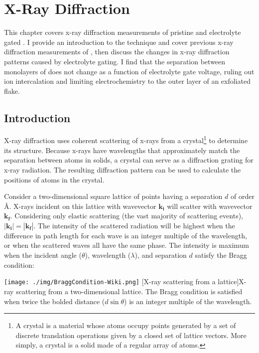 \chapter{X-Ray Diffraction}

This chapter covers x-ray diffraction measurements of pristine and electrolyte gated \ruclnospace . I provide an introduction to the technique and cover previous x-ray diffraction measurements of \ruclnospace , then discuss the changes in x-ray diffraction patterns caused by electrolyte gating. I find that the separation between monolayers of \rucl does not change as a function of electrolyte gate voltage, ruling out ion intercalation and limiting electrochemistry to the outer layer of an exfoliated flake.

\section{Introduction}

X-ray diffraction uses coherent scattering of x-rays from a crystal\footnote{A crystal is a material whose atoms occupy points generated by a set of discrete translation operations given by a closed set of lattice vectors. More simply, a crystal is a solid made of a regular array of atoms.} to determine its structure. Because x-rays have wavelengths that approximately match the separation between atoms in solids, a crystal can serve as a diffraction grating for x-ray radiation. The resulting diffraction pattern can be used to calculate the positions of atoms in the crystal.

Consider a two-dimensional square lattice of points having a separation $d$ of order \AA . X-rays incident on this lattice with wavevector $\mathbf{k_{i}}$ will scatter with wavevector $\mathbf{k_{f}}$. Considering only elastic scattering (the vast majority of scattering events), $|\mathbf{k_{i}}| = |\mathbf{k_{f}}|$. The intensity of the scattered radiation will be highest when the difference in path length for each wave is an integer multiple of the wavelength, or when the scattered waves all have the same phase. The intensity is maximum when the incident angle ($\theta$), wavelength ($\lambda$), and separation $d$ satisfy the Bragg condition:

\begin{centering}
\texttt{[image: ./img/BraggCondition-Wiki.png]}
  \captionsetup{width=0.75\textwidth}
  [X-ray scattering from a lattice]{X-ray scattering from a two-dimensional lattice. The Bragg condition is satisfied when twice the bolded distance ($d \sin \theta$) is an integer multiple of the wavelength.} 
  \label{fig:XrayIntro-1}
\end{centering}

